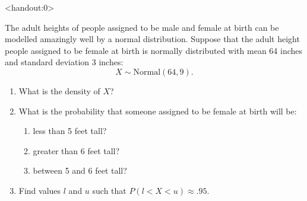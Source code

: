 \begin{frame}<handout:0>
  \begin{block}{\examplectd}
    The adult heights of people assigned to be male and female at birth can be modelled amazingly well by a normal distribution. Suppose that the adult height people assigned to be female at birth is normally distributed with mean 64 inches and standard deviation 3 inches:
    \[
      X \sim \mbox{Normal}(64,9).
    \]
    
    \begin{enumerate}[label=\alph*),start=1]
    \item What is the density of $X$?
    \item What is the probability that someone assigned to be female at birth will be:
      \begin{enumerate}[label=\roman*),start=1]
      \item less than 5 feet tall? 
      \item greater than 6 feet tall?
      \item between 5 and 6 feet tall?
      \end{enumerate}
    \item Find values $l$ and $u$ such that $P(l < X < u) \approx .95$. 
    \end{enumerate}
  \end{block}
\end{frame}

